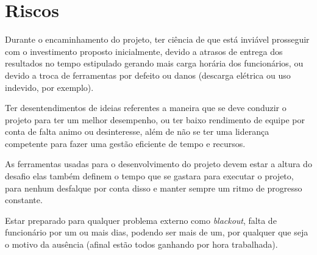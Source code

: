 \chapter[Riscos]{Riscos}

Durante o encaminhamento do projeto, ter ciência de que está inviável prosseguir com o investimento proposto inicialmente, devido a atrasos de entrega dos resultados no tempo estipulado gerando mais carga horária dos funcionários, ou devido a troca de ferramentas por defeito ou danos (descarga elétrica ou uso indevido, por exemplo).

Ter desentendimentos de ideias referentes a maneira que se deve conduzir o projeto para ter um melhor desempenho, ou ter baixo rendimento de equipe por conta de falta animo ou desinteresse, além de não se ter uma liderança competente para fazer uma gestão eficiente de tempo e recursos.

As ferramentas usadas para o desenvolvimento do projeto devem estar a altura do desafio elas também definem o tempo que se gastara para executar o projeto, para nenhum desfalque por conta disso e manter sempre um ritmo de progresso constante.

Estar preparado para qualquer problema externo como \textit{blackout}, falta de funcionário por um ou mais dias, podendo ser mais de um, por qualquer que seja o motivo da ausência (afinal estão todos ganhando por hora trabalhada).
